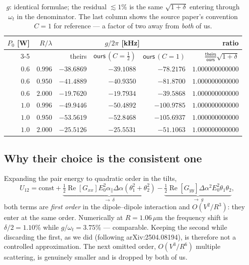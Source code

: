 \documentclass[11pt,a4paper]{article}
\newcommand{\dalpha}{\Delta\alpha}
\newcommand{\ours}{\textsf{ours}}
\newcommand{\theirs}{\textsf{theirs}}
\begin{document}
\begin{table}[h]
\centering\small
\begin{tabular}{rr rrr r}
\toprule
$P_0$ [W] & $R/\lambda$
& \multicolumn{3}{c}{$g/2\pi$ [kHz]} & ratio \\
\cmidrule(lr){3-5}
& & \theirs & $\ours\,(C=\tfrac12)$ & $\ours\,(C=1)$
& $\frac{\theirs}{\ours}\sqrt{1+\delta}$ \\
\midrule
$0.6$ & $0.996$ & $-38.6869$ & $-39.1088$ & $-78.2176$ & $1.000000000000$ \\
$0.6$ & $0.950$ & $-41.4889$ & $-40.9350$ & $-81.8700$ & $1.000000000000$ \\
$0.6$ & $2.000$ & $-19.7620$ & $-19.7934$ & $-39.5868$ & $1.000000000000$ \\
$1.0$ & $0.996$ & $-49.9446$ & $-50.4892$ & $-100.9785$ & $1.000000000000$ \\
$1.0$ & $0.950$ & $-53.5619$ & $-52.8468$ & $-105.6937$ & $1.000000000000$ \\
$1.0$ & $2.000$ & $-25.5126$ & $-25.5531$ & $-51.1063$ & $1.000000000000$ \\
\bottomrule
\end{tabular}
\caption{$g$: identical formulae; the residual $\lesssim1\%$ is the same
$\sqrt{1+\delta}$ entering through $\omega_t$ in the denominator.  The last
column shows the source paper's convention $C=1$ for reference --- a factor of
two away from \emph{both} of us.}
\label{tab:g20}
\end{table}

\subsection{Why their choice is the consistent one}
\label{sec:consistency}

Expanding the pair energy to quadratic order in the tilts,
\begin{equation}
  U_{12}=\text{const}
  +\underbrace{\tfrac12\operatorname{Re}[G_{xx}]E_0^{2}\alpha_{\parallel}\dalpha
    \left(\theta_1^{2}+\theta_2^{2}\right)}_{\textstyle\to\ \delta}
  -\underbrace{\tfrac12\operatorname{Re}[G_{yy}]\dalpha^{2}E_0^{2}
    \theta_1\theta_2}_{\textstyle\to\ g},
\end{equation}
both terms are \emph{first order} in the dipole--dipole interaction and
$O(V^{2}/R^{3})$: they enter at the same order.  Numerically at
$R=1.06\,\mu$m the frequency shift is $\delta/2=1.10\%$ while
$g/\omega_t=3.75\%$ --- comparable.  Keeping the second while discarding the
first, as we did (following arXiv:2504.08194), is therefore not a controlled
approximation.  The next omitted order, $O(V^{3}/R^{6})$ multiple scattering,
is genuinely smaller and is dropped by both of us.
\end{document}
